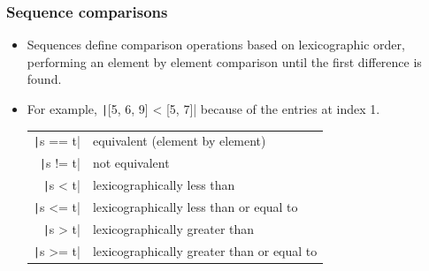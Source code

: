 \begin{frame}
    \frametitle{Sequence comparisons}

    \begin{itemize}
        \item Sequences define comparison operations based on lexicographic order, performing an element by element comparison until the first difference is found.
        \item For example, \texttt|[5, 6, 9] < [5, 7]| because of the entries at index 1.
              \begin{table}[htbp]
                  \centering
                  \begin{tabular}{rl}
                      \texttt|s == t| & equivalent (element by element)            \\
                      \texttt|s != t| & not equivalent                             \\
                      \texttt|s < t|  & lexicographically less than                \\
                      \texttt|s <= t| & lexicographically less than or equal to    \\
                      \texttt|s > t|  & lexicographically greater than             \\
                      \texttt|s >= t| & lexicographically greater than or equal to \\
                  \end{tabular}%
              \end{table}%

    \end{itemize}

\end{frame}

